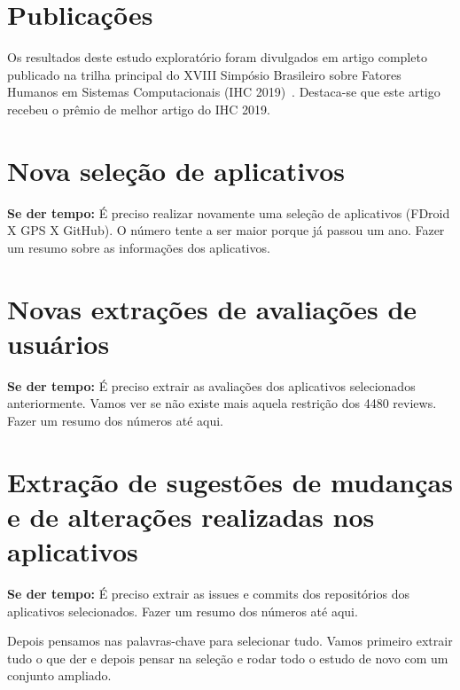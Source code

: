 \section{Publicações}

Os resultados deste estudo exploratório foram divulgados em artigo completo publicado na trilha principal do XVIII Simpósio Brasileiro sobre Fatores Humanos em Sistemas Computacionais (IHC 2019)~\cite{ihc2019}. Destaca-se que este artigo recebeu o prêmio de melhor artigo do IHC 2019. 

\section{Nova seleção de aplicativos}

\textbf{Se der tempo: } É preciso realizar novamente uma seleção de aplicativos (FDroid X GPS X GitHub). O número tente a ser maior porque já passou um ano. Fazer um resumo sobre as informações dos aplicativos.

\section{Novas extrações de avaliações de usuários}

\textbf{Se der tempo: } É preciso extrair as avaliações dos aplicativos selecionados anteriormente. Vamos ver se não existe mais aquela restrição dos 4480 reviews. Fazer um resumo dos números até aqui. 

\section{Extração de sugestões de mudanças e de alterações realizadas nos aplicativos}

\textbf{Se der tempo: } É preciso extrair as issues e commits dos repositórios dos aplicativos selecionados. Fazer um resumo dos números até aqui. 

Depois pensamos nas palavras-chave para selecionar tudo. Vamos primeiro extrair tudo o que der e depois pensar na seleção e rodar todo o estudo de novo com um conjunto ampliado. 


